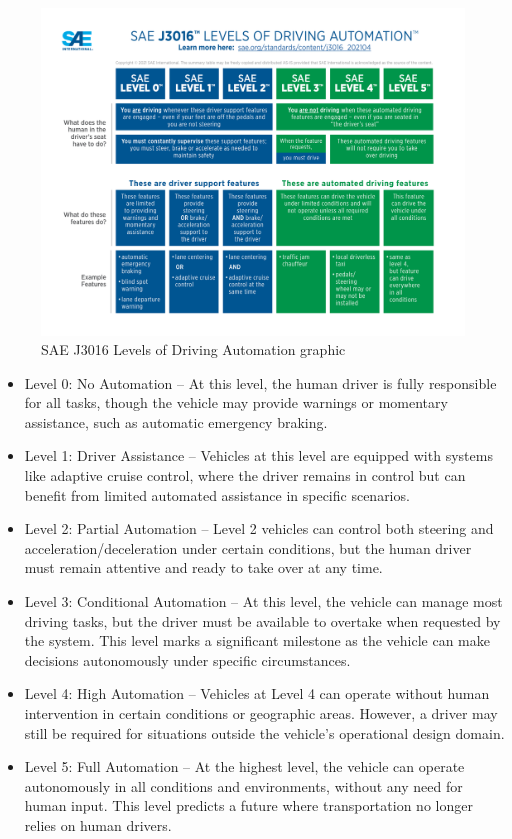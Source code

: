 \begin{figure}
    \centering
    \includegraphics[width=1\linewidth]{LateX//figs/sae-j3016-visual-chart_5.3.21.pdf}
    \caption{SAE J3016 Levels of Driving Automation graphic}
    \label{fig:enter-label}
\end{figure}

\begin{itemize}
    \item Level 0: No Automation – At this level, the human driver is fully responsible for all tasks, though the vehicle may provide warnings or momentary assistance, such as automatic emergency braking.
    \item Level 1: Driver Assistance – Vehicles at this level are equipped with systems like adaptive cruise control, where the driver remains in control but can benefit from limited automated assistance in specific scenarios.
    \item Level 2: Partial Automation – Level 2 vehicles can control both steering and acceleration/deceleration under certain conditions, but the human driver must remain attentive and ready to take over at any time.
    \item Level 3: Conditional Automation – At this level, the vehicle can manage most driving tasks, but the driver must be available to overtake when requested by the system. This level marks a significant milestone as the vehicle can make decisions autonomously under specific circumstances.
    \item Level 4: High Automation – Vehicles at Level 4 can operate without human intervention in certain conditions or geographic areas. However, a driver may still be required for situations outside the vehicle's operational design domain.
    \item Level 5: Full Automation – At the highest level, the vehicle can operate autonomously in all conditions and environments, without any need for human input. This level predicts a future where transportation no longer relies on human drivers.
\end{itemize}

